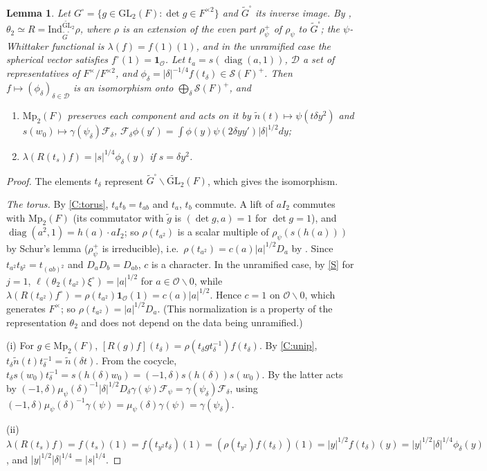 \documentclass[11pt,oneside,notitlepage]{book}
\numberwithin{equation}{section}
\theoremstyle{plain}
\newtheorem{lemma}[theorem]{Lemma}
\theoremstyle{definition}
\newcommand{\cO}{\mathcal{O}}
\newcommand{\GL}{\mathrm{GL}}
\newcommand{\Mp}{\mathrm{Mp}}
\newcommand{\cS}{\mathcal{S}}
\newcommand{\tGL}{\widetilde{\GL}}
\newcommand{\diag}{\operatorname{diag}}
\newcommand{\one}{\mathbf{1}}
\newcommand{\hil}[2]{(#1,#2)}
\begin{document}
\begin{lemma}\label{lem:theta2}
Let $G^\square=\{g\in\GL_2(F):\det g\in F^{\times2}\}$ and $\tilde G^\square$ its inverse image. By \cite[(2.13)--(2.14), Proposition 2.16]{Takeda}, $\theta_2\simeq R=\mathrm{Ind}_{\tilde G^\square}^{\tGL_2}\rho$, where $\rho$ is an extension of the even part $\rho_\psi^+$ of $\rho_\psi$ to $\tilde G^\square$; the $\psi$-Whittaker functional is $\lambda(f)=f(1)(1)$, and in the unramified case the spherical vector satisfies $f^\circ(1)=\one_\cO$. Let $t_a=s(\diag(a,1))$, $\mathcal D$ a set of representatives of $F^\times/F^{\times2}$, and $\phi_\delta=|\delta|^{-1/4}f(t_\delta)\in\cS(F)^+$. Then $f\mapsto(\phi_\delta)_{\delta\in\mathcal D}$ is an isomorphism onto $\bigoplus_\delta\cS(F)^+$, and
\begin{enumerate}[label=(\roman*)]
\item $\Mp_2(F)$ preserves each component and acts on it by $\tilde n(t)\mapsto\psi(t\delta y^2)$ and $s(w_0)\mapsto\gamma(\psi_\delta)\mathcal F_\delta$, $\mathcal F_\delta\phi(y')=\int\phi(y)\psi(2\delta yy')|\delta|^{1/2}dy$;
\item $\lambda(R(t_s)f)=|s|^{1/4}\phi_\delta(y)$ if $s=\delta y^2$.
\end{enumerate}
\end{lemma}
\begin{proof}
The elements $t_\delta$ represent $\tilde G^\square\backslash\tGL_2(F)$, which gives the isomorphism.

\emph{The torus.} By \ref{C:torus}, $t_at_b=t_{ab}$ and $t_a$, $t_b$ commute. A lift of $aI_2$ commutes with $\Mp_2(F)$ (its commutator with $\tilde g$ is $\hil{\det g}a=1$ for $\det g=1$), and $\diag(a^2,1)=h(a)\cdot aI_2$; so $\rho(t_{a^2})$ is a scalar multiple of $\rho_\psi(s(h(a)))$ by Schur's lemma ($\rho^+_\psi$ is irreducible), i.e.\ $\rho(t_{a^2})=c(a)|a|^{1/2}D_a$ by . Since $t_{a^2}t_{b^2}=t_{(ab)^2}$ and $D_aD_b=D_{ab}$, $c$ is a character. In the unramified case, by \ref{S} for $j=1$, $\ell(\theta_2(t_{a^2})\xi^\circ)=|a|^{1/2}$ for $a\in\cO\smallsetminus0$, while $\lambda(R(t_{a^2})f^\circ)=\rho(t_{a^2})\one_\cO(1)=c(a)|a|^{1/2}$. Hence $c=1$ on $\cO\smallsetminus0$, which generates $F^\times$; so $\rho(t_{a^2})=|a|^{1/2}D_a$. (This normalization is a property of the representation $\theta_2$ and does not depend on the data being unramified.)

(i) For $g\in\Mp_2(F)$, $[R(g)f](t_\delta)=\rho(t_\delta gt_\delta^{-1})f(t_\delta)$. By \ref{C:unip}, $t_\delta\tilde n(t)t_\delta^{-1}=\tilde n(\delta t)$. From the cocycle, $t_\delta s(w_0)t_\delta^{-1}=s(h(\delta)w_0)=\hil{-1}\delta s(h(\delta))s(w_0)$. By  the latter acts by $\hil{-1}\delta\mu_\psi(\delta)^{-1}|\delta|^{1/2}D_\delta\gamma(\psi)\mathcal F_\psi=\gamma(\psi_\delta)\mathcal F_\delta$, using $\hil{-1}\delta\mu_\psi(\delta)^{-1}\gamma(\psi)=\mu_\psi(\delta)\gamma(\psi)=\gamma(\psi_\delta)$.

(ii) $\lambda(R(t_s)f)=f(t_s)(1)=f(t_{y^2}t_\delta)(1)=(\rho(t_{y^2})f(t_\delta))(1)=|y|^{1/2}f(t_\delta)(y)=|y|^{1/2}|\delta|^{1/4}\phi_\delta(y)$, and $|y|^{1/2}|\delta|^{1/4}=|s|^{1/4}$.
\end{proof}
\end{document}
